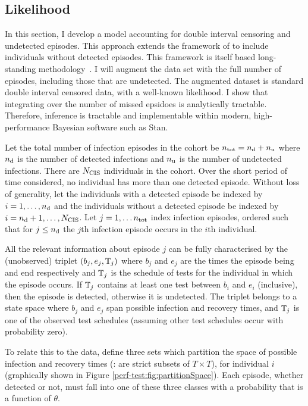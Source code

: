 \documentclass[thesis.tex]{subfiles}
\begin{document}
\subsection{Likelihood}\label{perf-test:sec:likelihood}

In this section, I develop a model accounting for double interval censoring and undetected episodes.
This approach extends the framework of \textcite{heiseyModelling} to include individuals without detected episodes.
This framework is itself based long-standing methodology~\autocites{dempsterMaximum}{turnbullEmpirical}.
I will augment the data set with the full number of episodes, including those that are undetected.
The augmented dataset is standard double interval censored data, with a well-known likelihood.
I show that integrating over the number of missed epsidoes is analytically tractable.
Therefore, inference is tractable and implementable within modern, high-performance Bayesian software such as Stan.

Let the total number of infection episodes in the cohort be $n_\text{tot} = n_\text{d} + n_\text{u}$ where $n_\text{d}$ is the number of detected infections and $n_\text{u}$ is the number of undetected infections.
There are $N_\text{CIS}$ individuals in the cohort.
Over the short period of time considered, no individual has more than one detected episode. 
Without loss of generality, let the individuals with a detected episode be indexed by $i = 1, \dots, n_\text{d}$ and the individuals without a detected episode be indexed by $i = n_\text{d} + 1, \dots, N_\text{CIS}$.
Let $j = 1, \dots n_\text{tot}$ index infection episodes, ordered such that for $j \leq n_\text{d}$ the $j$th infection episode occurs in the $i$th individual.

All the relevant information about episode $j$ can be fully characterised by the (unobserved) triplet $(b_j, e_j, \mathbb{T}_j)$ where $b_j$ and $e_j$ are the times the episode being and end respectively and $\mathbb{T}_j$ is the schedule of tests for the individual in which the episode occurs. 
If $\mathbb{T}_j$ contains at least one test between $b_i$ and $e_i$ (inclusive), then the episode is detected, otherwise it is undetected.
The triplet belongs to a state space where $b_j$ and $e_j$ span possible infection and recovery times, and $\mathbb{T}_j$ is one of the observed test schedules (assuming other test schedules occur with probability zero).

To relate this to the data, define three sets which partition the space of possible infection and recovery times (\ie: are strict subsets of $T \times T$), for individual $i$ (graphically shown in Figure \ref{perf-test:fig:partitionSpace}).
Each episode, whether detected or not, must fall into one of these three classes with a probability that is a function of $\theta$.
\end{document}
